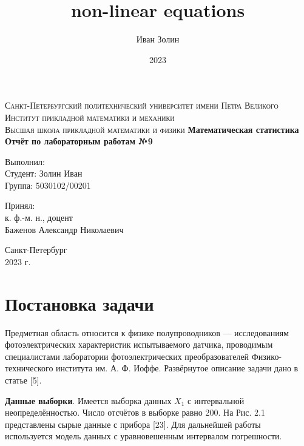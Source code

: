 \documentclass[a4paper,14pt]{article}
\title{non-linear equations}
\author{Иван Золин}
\date{2023}
\begin{document}
	
	\begin{titlepage}
		\begin{center}
			\textsc{
				Санкт-Петербургский политехнический университет имени Петра Великого \\[5mm]
				Институт прикладной математики и механики\\[2mm]
				Высшая школа прикладной математики и физики            
			}   
			\vfill
			\textbf{\large
				Математическая статистика\\
				Отчёт по лабораторным работам №9 \\[3mm]
			}                
		\end{center}
		
		\vfill
		\hfill
		\begin{minipage}{0.5\textwidth}
			Выполнил: \\[2mm]   
			Студент: Золин Иван \\
			Группа: 5030102/00201\\
		\end{minipage}
		
		\hfill
		\begin{minipage}{0.5\textwidth}
			Принял: \\[2mm]
			к. ф.-м. н., доцент \\   
			Баженов Александр Николаевич
		\end{minipage}
		
		\vfill
		\begin{center}
			Санкт-Петербург \\2023 г.
		\end{center}
	\end{titlepage}
	
	\tableofcontents
	\newpage
	\listoffigures
	\newpage
	
	\section{Постановка задачи}
	Предметная область относится к физике полупроводников — исследованиям
	фотоэлектрических характеристик испытываемого датчика, проводимым специалистами лаборатории фотоэлектрических преобразователей Физико-технического института им. А. Ф. Иоффе. Развёрнутое описание задачи дано в статье [5]. 
	
	\textbf{Данные выборки}. Имеется выборка данных $X_1$ с интервальной неопределённостью. Число отсчётов в выборке равно 200.
	На Рис. 2.1 представлены сырые данные с прибора [23].
	Для дальнейшей работы используется модель данных с уравновешенным интервалом погрешности.
	
\end{document}

